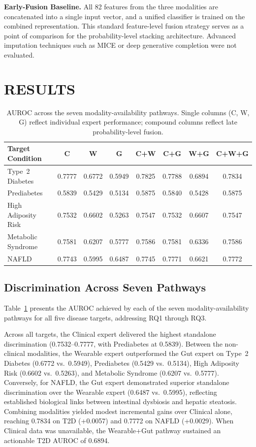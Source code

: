 \documentclass[10pt,twocolumn,letterpaper]{article}
\begin{document}
\textbf{Early-Fusion Baseline.} All 82 features from the three modalities are concatenated into a single input vector, and a unified classifier is trained on the combined representation. This standard feature-level fusion strategy serves as a point of comparison for the probability-level stacking architecture. Advanced imputation techniques such as MICE or deep generative completion were not evaluated.

\section{RESULTS}

\begin{table}[t]
\centering
\caption{AUROC across the seven modality-availability pathways. Single columns (C, W, G) reflect individual expert performance; compound columns reflect late probability-level fusion.}
\label{tab:fusion}
\begin{tabular}{@{}l ccccccc@{}}
\toprule
\textbf{Target Condition} & \textbf{C} & \textbf{W} & \textbf{G} & \textbf{C+W} & \textbf{C+G} & \textbf{W+G} & \textbf{C+W+G} \\
\midrule
Type~2 Diabetes & 0.7777 & 0.6772 & 0.5949 & 0.7825 & 0.7788 & 0.6894 & 0.7834 \\
Prediabetes & 0.5839 & 0.5429 & 0.5134 & 0.5875 & 0.5840 & 0.5428 & 0.5875 \\
High Adiposity Risk & 0.7532 & 0.6602 & 0.5263 & 0.7547 & 0.7532 & 0.6607 & 0.7547 \\
Metabolic Syndrome & 0.7581 & 0.6207 & 0.5777 & 0.7586 & 0.7581 & 0.6336 & 0.7586 \\
NAFLD & 0.7743 & 0.5995 & 0.6487 & 0.7745 & 0.7771 & 0.6621 & 0.7772 \\
\bottomrule
\end{tabular}
\end{table}

\subsection{Discrimination Across Seven Pathways}
Table~\ref{tab:fusion} presents the AUROC achieved by each of the seven modality-availability pathways for all five disease targets, addressing RQ1 through RQ3.

Across all targets, the Clinical expert delivered the highest standalone discrimination (0.7532--0.7777, with Prediabetes at 0.5839). Between the non-clinical modalities, the Wearable expert outperformed the Gut expert on Type~2 Diabetes (0.6772 vs.\ 0.5949), Prediabetes (0.5429 vs.\ 0.5134), High Adiposity Risk (0.6602 vs.\ 0.5263), and Metabolic Syndrome (0.6207 vs.\ 0.5777). Conversely, for NAFLD, the Gut expert demonstrated superior standalone discrimination over the Wearable expert (0.6487 vs.\ 0.5995), reflecting established biological links between intestinal dysbiosis and hepatic steatosis. Combining modalities yielded modest incremental gains over Clinical alone, reaching 0.7834 on T2D (+0.0057) and 0.7772 on NAFLD (+0.0029). When Clinical data was unavailable, the Wearable+Gut pathway sustained an actionable T2D AUROC of 0.6894.
\end{document}

